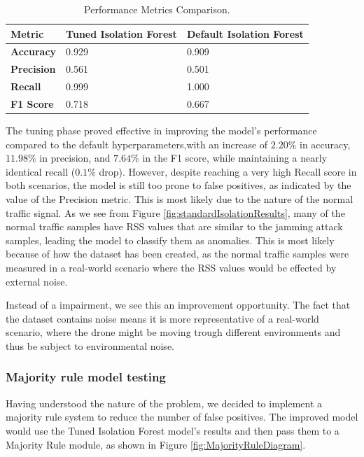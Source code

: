 \documentclass[futureinternet,article,submit,pdftex,moreauthors]{Definitions/mdpi}
\begin{document}
\begin{table}[H]
    \caption{Performance Metrics Comparison.}\label{tab:performanceMetrics}
    \begin{tabularx}{\textwidth}{CCC}
    \toprule
    \textbf{Metric} & \textbf{Tuned Isolation Forest} & \textbf{Default Isolation Forest} \\
    \midrule
    \textbf{Accuracy} & 0.929 & 0.909 \\
    \textbf{Precision} & 0.561 & 0.501 \\
    \textbf{Recall} & 0.999 & 1.000 \\
    \textbf{F1 Score} & 0.718 & 0.667 \\
    \bottomrule
    \end{tabularx}
\end{table}


The tuning phase proved effective in improving the model's performance compared to the default hyperparameters,with an increase of $2.20\%$ in accuracy, $11.98\%$ in precision, and $7.64\%$ in the F1 score, while maintaining a nearly identical recall ($0.1\%$ drop). However, despite reaching a very high Recall score in both scenarios, the model is still too prone to false positives, as indicated by the value of the Precision metric. 
This is most likely due to the nature of the normal traffic signal. As we see from Figure \ref{fig:standardIsolationResults}, many of the normal traffic samples have RSS values that are similar to the jamming attack samples, leading the model to classify them as anomalies.
This is most likely because of how the dataset has been created, as the normal traffic samples were measured in a real-world scenario where the RSS values would be effected by external noise. 

Instead of a impairment, we see this an improvement opportunity. The fact that the dataset contains noise means it is more representative of a real-world scenario, where the drone might be moving trough different environments and thus be subject to environmental noise.

\subsubsection{Majority rule model testing} \label{sec:majorityRuleModelTesting}

Having understood the nature of the problem, we decided to implement a majority rule system to reduce the number of false positives. The improved model would use the Tuned Isolation Forest model's results and then pass them to a Majority Rule module, as shown in Figure \ref{fig:MajorityRuleDiagram}. 
\end{document}
